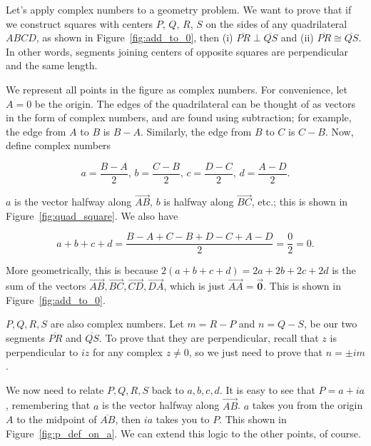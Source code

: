 \documentclass[../textbook.tex]{subfiles}
\begin{document}
\noindent Let’s apply complex numbers to a geometry problem. We want to prove that if we construct squares with centers $P$, $Q$, $R$, $S$ on the sides of any quadrilateral $ABCD$, as shown in Figure~\ref{fig:add_to_0}, then (i) $\overline{PR} \perp \overline{QS}$ and (ii) $\overline{PR} \cong \overline{QS}$. In other words, segments joining centers of opposite squares are perpendicular and the same length.

We represent all points in the figure as complex numbers. For convenience, let $A=0$ be the origin. The edges of the quadrilateral can be thought of as vectors in the form of complex numbers, and are found using subtraction; for example, the edge from $A$ to $B$ is $B-A$. Similarly, the edge from $B$ to $C$ is $C-B$. Now, define complex numbers

$$a=\frac{B-A}{2},\, b=\frac{C-B}{2},\, c = \frac{D-C}{2},\, d = \frac{A-D}{2}.$$

\noindent$a$ is the vector halfway along $\overrightarrow{AB}$, $b$ is halfway along $\overrightarrow{BC}$, etc.; this is shown in Figure~\ref{fig:quad_square}. We also have

$$a+b+c+d=\frac{B-A+C-B+D-C+A-D}{2}=\frac{0}{2}=0.$$

\noindent More geometrically, this is because $2(a+b+c+d)=2a+2b+2c+2d$ is the sum of the vectors $\overrightarrow{AB}, \overrightarrow{BC}, \overrightarrow{CD}, \overrightarrow{DA}$, which is just $\overrightarrow{AA}=\overrightarrow{\mathbf{0}}$. This is shown in Figure~\ref{fig:add_to_0}.

$P,Q,R,S$ are also complex numbers. Let $m=R-P$ and $n = Q-S$, be our two segments $\overline{PR}$ and $\overline{QS}$. To prove that they are perpendicular, recall that $z$ is perpendicular to $iz$ for any complex $z\neq 0$, so we just need to prove that $n=\pm im$.

We now need to relate $P,Q,R,S$ back to $a,b,c,d$. It is easy to see that $P = a+ia$, remembering that $a$ is the vector halfway along $\overrightarrow{AB}$. $a$ takes you from the origin $A$ to the midpoint of $\overline{AB}$, then $ia$ takes you to $P$. This shown in Figure~\ref{fig:p_def_on_a}. We can extend this logic to the other points, of course.

\end{document}
